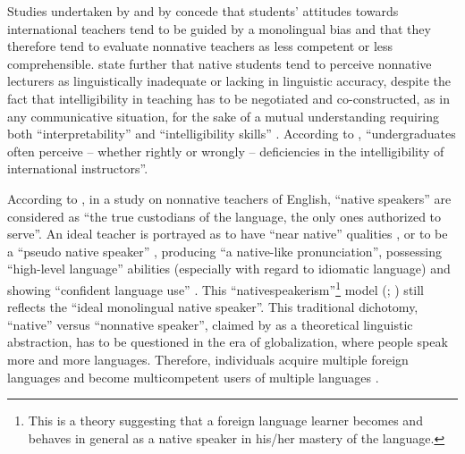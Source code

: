 \documentclass[output=paper]{../langscibook}
\begin{document}
Studies undertaken by \citet{Subtirelu2015} and by \citet{KangEtAl2015} concede that students’ attitudes towards international teachers tend to be guided by a monolingual bias and that they therefore tend to evaluate nonnative teachers as less competent or less comprehensible. \citet{KangEtAl2015} state further that native students tend to perceive nonnative lecturers as linguistically inadequate or lacking in linguistic accuracy, despite the fact that intelligibility in teaching has to be negotiated and co-constructed, as in any communicative situation, for the sake of a mutual understanding requiring both “interpretability” and “intelligibility skills” \citep{Candlin1982}. According to \citet[684]{KangEtAl2015}, “undergraduates often perceive – whether rightly or wrongly – deficiencies in the intelligibility of international instructors”.

According to \citet[284]{Rajagopalan2005}, in a study on nonnative teachers of English, “native speakers” are considered as “the true custodians of the language, the only ones authorized to serve”. An ideal teacher is portrayed as to have “near native” qualities \citep{Coppieters1987}, or to be a “pseudo native speaker” \citep{Medgyes1994}, producing “a native-like pronunciation”, possessing “high-level language” abilities (especially with regard to idiomatic language) and showing “confident language use” \citep{Inbar-Lourie2005}. This ``nativespeakerism''\footnote{This is a theory suggesting that a foreign language learner becomes and behaves in general as a native speaker in his/her mastery of the language.} model (\citealt{Gnutzmann1999}; \citealt{Holliday2006}) still reflects the “ideal monolingual native speaker”. This traditional dichotomy, “native” versus “nonnative speaker”, claimed by \citet{Derivry2006} as a theoretical linguistic abstraction, has to be questioned in the era of globalization, where people speak more and more languages. Therefore, individuals acquire multiple foreign languages and become multicompetent users of multiple languages \citep{Cook2002}.
\end{document}
